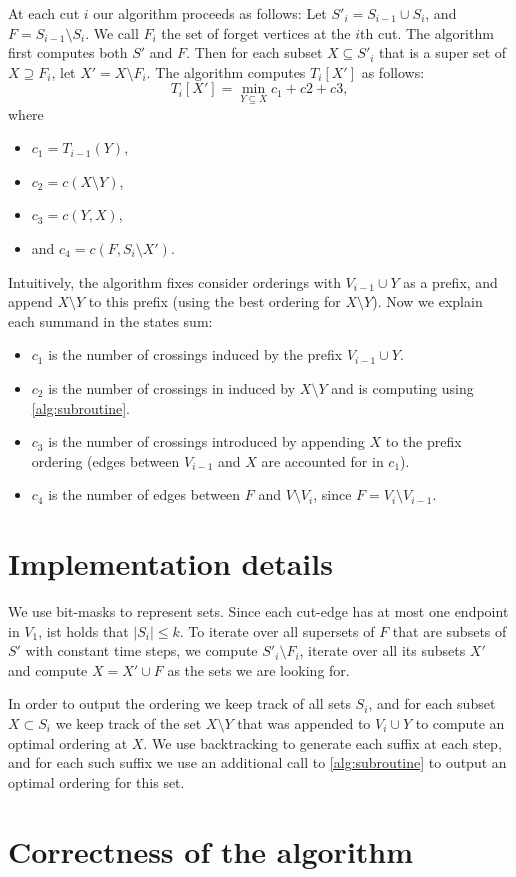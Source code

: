 \documentclass[a4paper,UKenglish,cleveref, autoref, thm-restate]{lipics-v2021}
\begin{document}
At each cut $i$ our algorithm proceeds as follows: 
Let $S'_i = S_{i-1} \cup S_i$, and $F = S_{i-1} \setminus S_{i}$. We call $F_i$ the set of forget vertices at the $i$th cut. The algorithm first computes both $S'$ and $F$. Then for each subset $X \subseteq S'_i$ that is a super set of $X \supseteq F_i$, let $X' = X\setminus F_i$. The algorithm computes $T_{i}[X']$ as follows:
    \[T_i[X'] = \min\limits_{Y\subseteq X} c_1 + c2 + c3,\]
where
\begin{itemize}
    \item $c_1 = T_{i-1}(Y)$,
    \item $c_2 = c(X\setminus Y)$,
    \item $c_3 = c(Y, X)$,
    \item and $c_4 = c(F, S_i \setminus X')$.
\end{itemize}
Intuitively, the algorithm fixes consider orderings with $V_{i-1} \cup Y$ as a prefix, and append $X \setminus Y$ to this prefix (using the best ordering for $X\setminus Y$). Now we explain each summand in the states sum:
\begin{itemize}
    \item $c_1$ is the number of crossings induced by the prefix $V_{i-1}\cup Y$.
    \item $c_2$ is the number of crossings in induced by $X\setminus Y$ and is computing using \cref{alg:subroutine}.
    \item $c_3$ is the number of crossings introduced by appending $X$ to the prefix ordering (edges between $V_{i-1}$ and $X$ are accounted for in $c_1$).
    \item $c_4$ is the number of edges between $F$ and $V\setminus V_{i}$, since $F = V_i \setminus V_{i-1}$.
\end{itemize}

\section{Implementation details}
We use bit-masks to represent sets. Since each cut-edge has at most one endpoint in $V_1$, ist holds that $|S_i|\leq k$. To iterate over all supersets of $F$ that are subsets of $S'$ with constant time steps, we compute $S'_i\setminus F_i$, iterate over all its subsets $X'$ and compute $X = X' \cup F$ as the sets we are looking for.

In order to output the ordering we keep track of all sets $S_i$, and for each subset $X\subset S_i$ we keep track of the set $X\setminus Y$ that was appended to $V_i \cup Y$ to compute an optimal ordering at $X$. We use backtracking to generate each suffix at each step, and for each such suffix we use an additional call to \cref{alg:subroutine} to output an optimal ordering for this set.

\section{Correctness of the algorithm}

\end{document}
